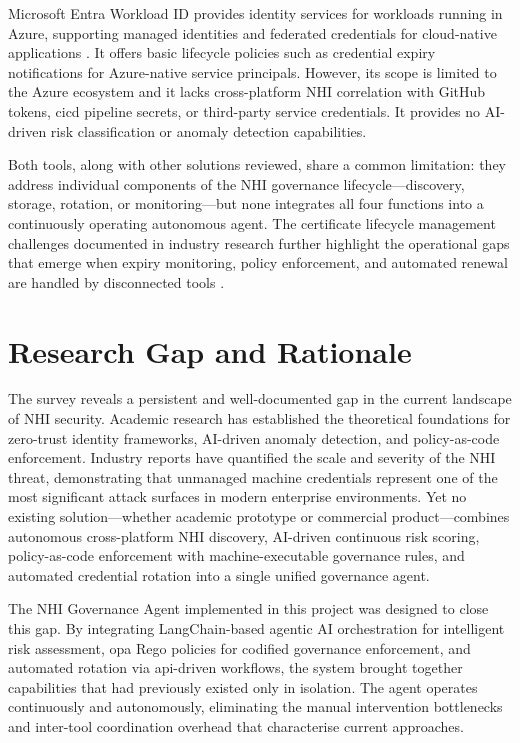 Microsoft Entra Workload ID provides identity services for workloads running in Azure, supporting managed identities and federated credentials for cloud-native applications \cite{EntraWorkloadID}. It offers basic lifecycle policies such as credential expiry notifications for Azure-native service principals. However, its scope is limited to the Azure ecosystem and it lacks cross-platform NHI correlation with GitHub tokens, \gls{cicd} pipeline secrets, or third-party service credentials. It provides no AI-driven risk classification or anomaly detection capabilities.

Both tools, along with other solutions reviewed, share a common limitation: they address individual components of the NHI governance lifecycle---discovery, storage, rotation, or monitoring---but none integrates all four functions into a continuously operating autonomous agent. The certificate lifecycle management challenges documented in industry research further highlight the operational gaps that emerge when expiry monitoring, policy enforcement, and automated renewal are handled by disconnected tools \cite{Ponemon2024}.

\section[Research Gap and Rationale]{\textbf{Research Gap and Rationale}}
The survey reveals a persistent and well-documented gap in the current landscape of NHI security. Academic research has established the theoretical foundations for zero-trust identity frameworks, AI-driven anomaly detection, and policy-as-code enforcement. Industry reports have quantified the scale and severity of the NHI threat, demonstrating that unmanaged machine credentials represent one of the most significant attack surfaces in modern enterprise environments. Yet no existing solution---whether academic prototype or commercial product---combines autonomous cross-platform NHI discovery, AI-driven continuous risk scoring, policy-as-code enforcement with machine-executable governance rules, and automated credential rotation into a single unified governance agent.

The NHI Governance Agent implemented in this project was designed to close this gap. By integrating LangChain-based agentic AI orchestration for intelligent risk assessment, \gls{opa} Rego policies for codified governance enforcement, and automated rotation via \gls{api}-driven workflows, the system brought together capabilities that had previously existed only in isolation. The agent operates continuously and autonomously, eliminating the manual intervention bottlenecks and inter-tool coordination overhead that characterise current approaches.

